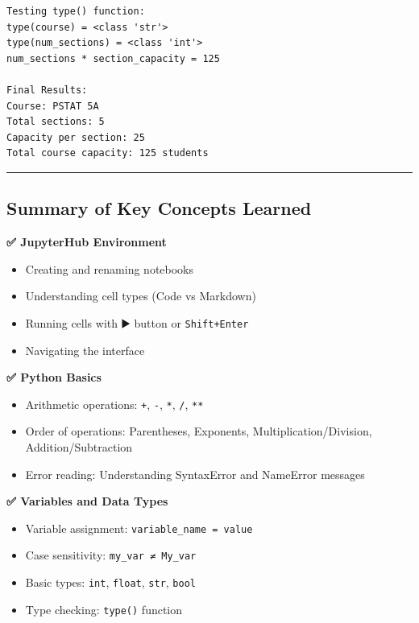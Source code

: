 \documentclass[
  11pt,
]{article}
\begin{document}
\begin{verbatim}
Testing type() function:
type(course) = <class 'str'>
type(num_sections) = <class 'int'>
num_sections * section_capacity = 125

Final Results:
Course: PSTAT 5A
Total sections: 5
Capacity per section: 25
Total course capacity: 125 students
\end{verbatim}

\begin{center}\rule{0.5\linewidth}{0.5pt}\end{center}

\subsection{Summary of Key Concepts
Learned}\label{summary-of-key-concepts-learned}

\textbf{✅ JupyterHub Environment}

\begin{itemize}
\item
  Creating and renaming notebooks
\item
  Understanding cell types (Code vs Markdown)
\item
  Running cells with ▶️ button or \texttt{Shift+Enter}
\item
  Navigating the interface
\end{itemize}

\textbf{✅ Python Basics}

\begin{itemize}
\item
  Arithmetic operations: \texttt{+}, \texttt{-}, \texttt{*}, \texttt{/},
  \texttt{**}
\item
  Order of operations: Parentheses, Exponents, Multiplication/Division,
  Addition/Subtraction
\item
  Error reading: Understanding SyntaxError and NameError messages
\end{itemize}

\textbf{✅ Variables and Data Types}

\begin{itemize}
\item
  Variable assignment: \texttt{variable\_name\ =\ value}
\item
  Case sensitivity: \texttt{my\_var\ ≠\ My\_var}
\item
  Basic types: \texttt{int}, \texttt{float}, \texttt{str}, \texttt{bool}
\item
  Type checking: \texttt{type()} function
\end{itemize}
\end{document}
